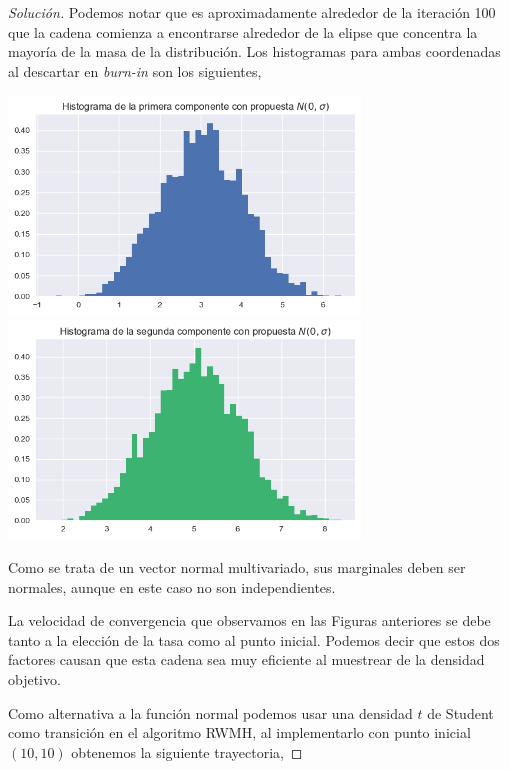 \documentclass{article}
\begin{document}
\begin{enumerate}
\begin{proof}[Solución]
        Podemos notar que es aproximadamente alrededor de la iteración 100 que la cadena comienza
        a encontrarse alrededor de la elipse que concentra la mayoría de la masa de la distribución.
        Los histogramas para ambas coordenadas al descartar en \textit{burn-in} son los siguientes,

        \begin{center}
            \includegraphics[width=0.7\textwidth]{tarea7/histrwnorm1.png}
            \includegraphics[width=0.7\textwidth]{tarea7/histrwnorm2.png}
        \end{center}

        Como se trata de un vector normal multivariado, sus marginales deben ser normales, aunque
        en este caso no son independientes.

        La velocidad de convergencia que observamos en las Figuras anteriores se debe tanto a la
        elección de la tasa como al punto inicial. Podemos decir que estos dos factores causan
        que esta cadena sea muy eficiente al muestrear de la densidad objetivo.

        Como alternativa a la función normal podemos usar una densidad $t$ de Student como 
        transición en el algoritmo RWMH, al implementarlo con punto inicial $(10,10)$ obtenemos
        la siguiente trayectoria,


\end{proof}
\end{enumerate}
\end{document}
